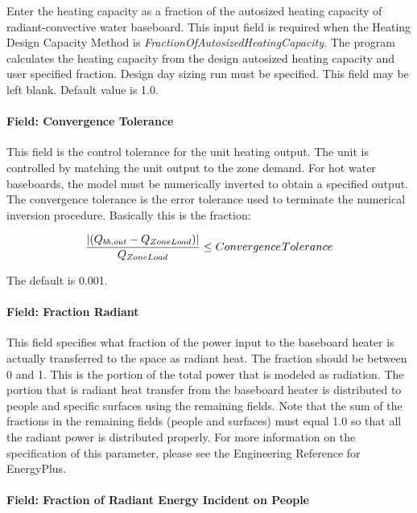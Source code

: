 Enter the heating capacity as a fraction of the autosized heating capacity of radiant-convective water baseboard. This input field is required when the Heating Design Capacity Method is \emph{FractionOfAutosizedHeatingCapacity}. The program calculates the heating capacity from the design autosized heating capacity and user specified fraction. Design day sizing run must be specified. This field may be left blank. Default value is 1.0.

\paragraph{Field: Convergence Tolerance}\label{field-convergence-tolerance-000}

This field is the control tolerance for the unit heating output. The unit is controlled by matching the unit output to the zone demand. For hot water baseboards, the model must be numerically inverted to obtain a specified output. The convergence tolerance is the error tolerance used to terminate the numerical inversion procedure. Basically this is the fraction:

\begin{equation}
\frac{{\left| {({Q_{bb,out}} - {Q_{ZoneLoad}})} \right|}}{{{Q_{ZoneLoad}}}} \le Convergence{\kern 1pt} Tolerance
\end{equation}

The default is 0.001.

\paragraph{Field: Fraction Radiant}\label{field-fraction-radiant-000}

This field specifies what fraction of the power input to the baseboard heater is actually transferred to the space as radiant heat. The fraction should be between 0 and 1. This is the portion of the total power that is modeled as radiation. The portion that is radiant heat transfer from the baseboard heater is distributed to people and specific surfaces using the remaining fields. Note that the sum of the fractions in the remaining fields (people and surfaces) must equal 1.0 so that all the radiant power is distributed properly. For more information on the specification of this parameter, please see the Engineering Reference for EnergyPlus.

\paragraph{Field: Fraction of Radiant Energy Incident on People}\label{field-fraction-of-radiant-energy-incident-on-people}

